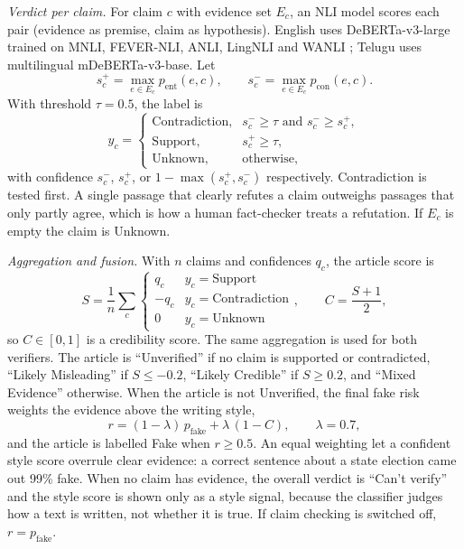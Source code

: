 \documentclass[conference]{IEEEtran}
\begin{document}
\textit{Verdict per claim.} For claim $c$ with evidence set $E_c$, an NLI model scores each pair (evidence as premise, claim as hypothesis). English uses DeBERTa-v3-large trained on MNLI, FEVER-NLI, ANLI, LingNLI and WANLI \cite{laurer2024nli}; Telugu uses multilingual mDeBERTa-v3-base. Let
\begin{equation}
s^{+}_c = \max_{e\in E_c} p_{\text{ent}}(e,c), \qquad s^{-}_c = \max_{e\in E_c} p_{\text{con}}(e,c).
\end{equation}
With threshold $\tau = 0.5$, the label is
\begin{equation}
y_c = \begin{cases}
\text{Contradiction}, & s^{-}_c \ge \tau \text{ and } s^{-}_c \ge s^{+}_c,\\
\text{Support}, & s^{+}_c \ge \tau,\\
\text{Unknown}, & \text{otherwise,}
\end{cases}
\end{equation}
with confidence $s^{-}_c$, $s^{+}_c$, or $1-\max(s^{+}_c,s^{-}_c)$ respectively. Contradiction is tested first. A single passage that clearly refutes a claim outweighs passages that only partly agree, which is how a human fact-checker treats a refutation. If $E_c$ is empty the claim is Unknown.

\textit{Aggregation and fusion.} With $n$ claims and confidences $q_c$, the article score is
\begin{equation}
S = \frac{1}{n}\sum_{c} \begin{cases} q_c & y_c=\text{Support}\\ -q_c & y_c=\text{Contradiction}\\ 0 & y_c=\text{Unknown}\end{cases},
\qquad C = \frac{S+1}{2},
\end{equation}
so $C\in[0,1]$ is a credibility score. The same aggregation is used for both verifiers. The article is ``Unverified'' if no claim is supported or contradicted, ``Likely Misleading'' if $S\le-0.2$, ``Likely Credible'' if $S\ge0.2$, and ``Mixed Evidence'' otherwise. When the article is not Unverified, the final fake risk weights the evidence above the writing style,
\begin{equation}
r = (1-\lambda)\,p_{\text{fake}} + \lambda\,(1-C), \qquad \lambda = 0.7,
\end{equation}
and the article is labelled Fake when $r\ge0.5$. An equal weighting let a confident style score overrule clear evidence: a correct sentence about a state election came out 99\% fake. When no claim has evidence, the overall verdict is ``Can't verify'' and the style score is shown only as a style signal, because the classifier judges how a text is written, not whether it is true. If claim checking is switched off, $r=p_{\text{fake}}$.
\end{document}
